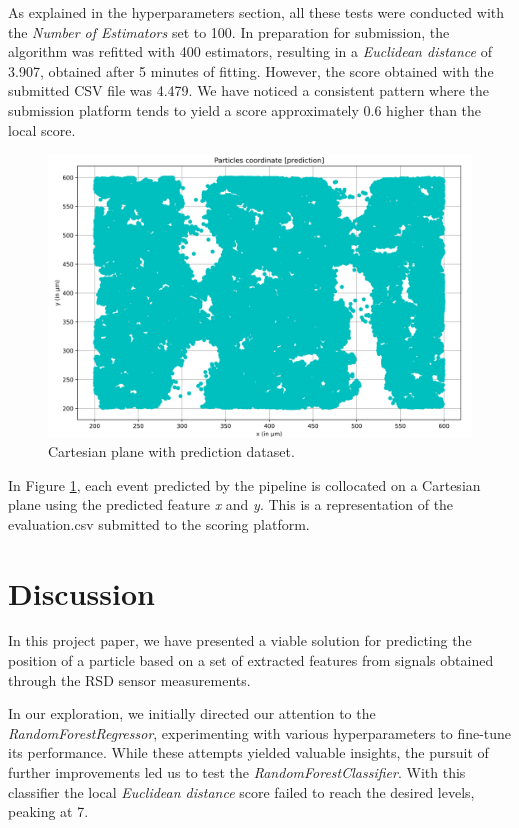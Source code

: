 \documentclass[conference]{IEEEtran}
\begin{document}
As explained in the hyperparameters section, all these tests were conducted with 
the \textit{Number of Estimators} set to 100. In preparation for submission, the algorithm 
was refitted with 400 estimators, resulting in a \textit{Euclidean distance} 
of 3.907, obtained after 5 minutes of fitting. 
However, the score obtained with the submitted CSV file was 4.479. 
We have noticed a consistent pattern where the submission platform tends to yield a 
score approximately 0.6 higher than the local score.

\begin{figure}[htbp]
\centerline{\includegraphics[width=\linewidth]{media/plot_prediction.png}}
\caption{Cartesian plane with prediction dataset.}
\label{fig:cartesian_plane_prediction}
\end{figure}

In Figure \ref{fig:cartesian_plane_prediction}, each event predicted by the pipeline
is collocated on a Cartesian plane using the predicted feature \textit{x} and \textit{y}.
This is a representation of the evaluation.csv submitted to the scoring platform.


\section{Discussion}
In this project paper, we have presented a viable solution for predicting the 
position of a particle based on a set of extracted features from signals obtained 
through the RSD sensor measurements.

In our exploration, we initially directed our attention to the \textit{RandomForestRegressor}, 
experimenting with various hyperparameters to fine-tune its performance. 
While these attempts yielded valuable insights, the pursuit of further improvements 
led us to test the \textit{RandomForestClassifier}. With this classifier the 
local \textit{Euclidean distance} score failed to reach the desired levels, peaking at 7.
\end{document}
